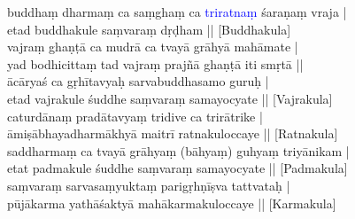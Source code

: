 \documentclass[a4paper,11pt]{book}
\def\verse{\pstart \hsize 330pt \rightskip 40pt \noindent}
\begin{document}
%
%
\pend

\verse
[Skt.\ Reconstruction]  buddhaṃ dharmaṃ ca saṃghaṃ ca \textcolor{blue}{triratnaṃ} śaraṇaṃ vraja |\\
etad buddhakule  saṃvaraṃ  dṛḍham || [Buddhakula]\\
vajraṃ ghaṇṭā ca mudrā ca tvayā grāhyā mahāmate |\\
yad bodhicittaṃ tad vajraṃ prajñā ghaṇṭā iti smṛtā ||\\
ācāryaś ca gṛhītavyaḥ sarvabuddhasamo guruḥ |\\
etad vajrakule śuddhe saṃvaraṃ samayocyate || [Vajrakula]\\
caturdānaṃ pradātavyaṃ tridive ca trirātrike |\\
āmiṣābhayadharmākhyā maitrī ratnakuloccaye || [Ratnakula]\\
saddharmaṃ ca tvayā grāhyaṃ (bāhyaṃ) guhyaṃ triyānikam |\\
etat padmakule śuddhe saṃvaraṃ samayocyate || [Padmakula]\\
saṃvaraṃ sarvasaṃyuktaṃ parigṛhṇīṣva tattvataḥ |\\
pūjākarma yathāśaktyā mahākarmakuloccaye || [Karmakula]
%
\pend
\end{document}
